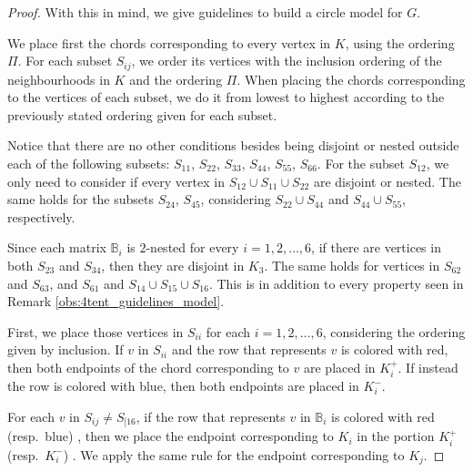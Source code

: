 \documentclass[12pt]{book}
\theoremstyle{plain}
\theoremstyle{remark}
\begin{document}
\begin{proof}
With this in mind, we give guidelines to build a circle model for $G$.

\vspace{2mm}
We place first the chords corresponding to every vertex in $K$, using the ordering $\Pi$. 
For each subset $S_{ij}$, we order its vertices with the inclusion ordering of the neighbourhoods in $K$ and the ordering $\Pi$. When placing the chords corresponding to the vertices of each subset, we do it from lowest to highest according to the previously stated ordering given for each subset.

Notice that there are no other conditions besides being disjoint or nested outside each of the following subsets: $S_{11}$, $S_{22}$, $S_{33}$, $S_{44}$, $S_{55}$, $S_{66}$.
For the subset $S_{12}$, we only need to consider if every vertex in $S_{12} \cup S_{11} \cup S_{22}$ are disjoint or nested. The same holds for the subsets $S_{24}$, $S_{45}$, considering $S_{22} \cup S_{44}$ and $S_{44} \cup S_{55}$, respectively. 

Since each matrix $\mathbb B_i$ is $2$-nested for every $i=1, 2, \ldots, 6$, if there are vertices in both $S_{23}$ and $S_{34}$, then they are disjoint in $K_3$. The same holds for vertices in $S_{62}$ and $S_{63}$, and $S_{61}$ and $S_{14} \cup S_{15} \cup S_{16}$.
This is in addition to every property seen in Remark \ref{obs:4tent_guidelines_model}.


First, we place those vertices in $S_{ii}$ for each $i=1,2, \ldots, 6$, considering the ordering given by inclusion. If $v$ in $S_{ii}$ and the row that represents $v$ is colored with red, then both endpoints of the chord corresponding to $v$ are placed in $K_i^+$. If instead the row is colored with blue, then both endpoints are placed in $K_i^-$. 

For each $v$ in $S_{ij} \neq S_{[16}$, if the row that represents $v$ in $\mathbb B_i$ is colored with red (resp.\ blue) , then we place the endpoint corresponding to $K_i$ in the portion $K_i^+$ (resp.\ $K_i^-$) . We apply the same rule for the endpoint corresponding to $K_j$.


\end{proof}
\end{document}
